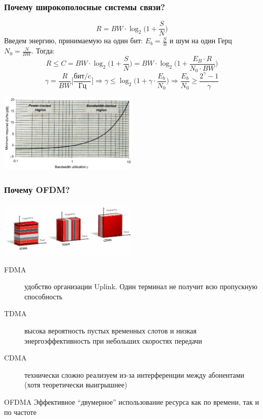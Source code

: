 \documentclass[utf8]{beamer}
\begin{document}
\begin{frame}
\frametitle{Почему широкополосные системы связи?}
$$
R = BW\cdot\log_2\Big(1 + \frac{S}{N}\Big)
$$
Введем энергию, принимаемую на один бит:  $E_b=\frac{S}{R}$ и шум на один Герц $N_0 = \frac{N}{BW}$. Тогда:
$$
R\leq C=BW\cdot\log_2\Big(1 + \frac{S}{N}\Big)=BW\cdot\log_2\Big(1+ \frac{E_B\cdot R}{N_0 \cdot BW}\Big)
$$
$$
\gamma = \frac{R}{BW}\Big[\frac{\textrm{бит/c}}{\textrm{Гц}}\Big] \Rightarrow \gamma \leq\log_2\Big(1+\gamma\cdot\frac{E_b}{N_0}\Big) \Rightarrow \frac{E_b}{N_0} \geq \frac{2^{\gamma}-1}{\gamma}
$$
\begin{center}
\includegraphics[width=0.5\textwidth]{pic/shannon.png}
\end{center}
\end{frame}
\begin{frame}
\frametitle{Почему OFDM?}
\begin{center}
\includegraphics[width=0.5\textwidth]{pic/fdm-tdm-cdm.png}
\end{center}
\begin{description}
\item[FDMA] удобство организации Uplink. Один терминал не получит всю пропускную способность
\item[TDMA] высока вероятность пустых временных слотов и низкая энергоэффективность при небольших скоростях передачи
\item[CDMA] технически сложно реализуем из-за интерференции между абонентами (хотя теоретически выигрышнее)
\end{description}
\begin{block}{OFDMA}
Эффективное ``двумерное'' использование ресурса как по времени, так и по частоте
\end{block}
\end{frame}
\end{document}
